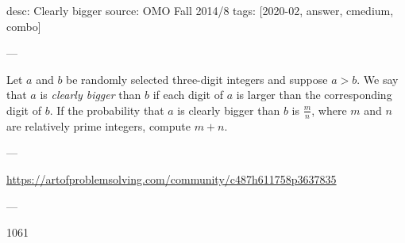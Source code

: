 desc: Clearly bigger
source: OMO Fall 2014/8
tags: [2020-02, answer, cmedium, combo]

---

Let $a$ and $b$ be randomly selected three-digit integers and suppose $a > b$.
We say that $a$ is \emph{clearly bigger} than $b$ if each digit of $a$ is larger than the corresponding digit of $b$.
If the probability that $a$ is clearly bigger than $b$ is $\tfrac mn$, where $m$ and $n$ are relatively prime integers,
compute $m+n$.

---

\url{https://artofproblemsolving.com/community/c487h611758p3637835}

---

1061
